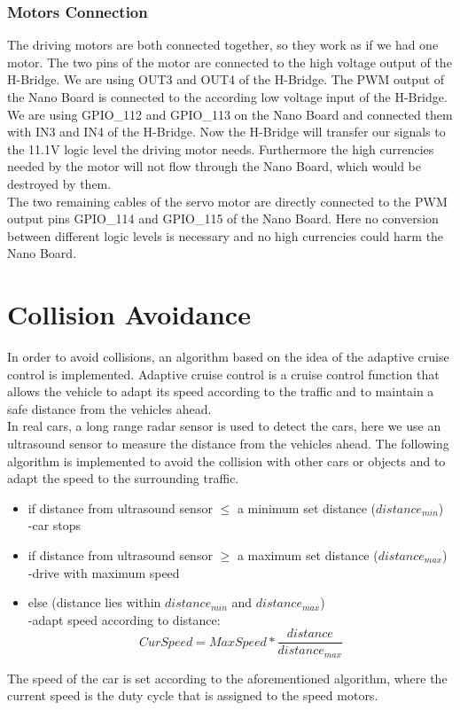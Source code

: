 \documentclass[11pt,twocolumn]{article}
\begin{document}
\subsubsection{Motors Connection}
The driving motors are both connected together, so they work as if we had one motor. The two pins of the motor are connected to the high voltage output of the H-Bridge. We are using OUT3 and OUT4 of the H-Bridge. The PWM output of the Nano Board is connected to the according low voltage input of the H-Bridge. We are using GPIO\_112 and GPIO\_113 on the Nano Board and connected them with IN3 and IN4 of the H-Bridge. Now the H-Bridge will transfer our signals to the 11.1V logic level the driving motor needs. Furthermore the high currencies needed by the motor will not flow through the Nano Board, which would be destroyed by them.\\
The two remaining cables of the servo motor are directly connected to the PWM output pins GPIO\_114 and GPIO\_115 of the Nano Board. Here no conversion between different logic levels is necessary and no high currencies could harm the Nano Board.



\section{Collision Avoidance}
\label{Usensor}
In order to avoid collisions, an algorithm based on the idea of the adaptive cruise control is implemented. Adaptive cruise control is a cruise control function that allows the vehicle to adapt its speed according to the traffic and to maintain a safe distance from the vehicles ahead.\\
In real cars, a long range radar sensor is used to detect the cars, here we use an ultrasound sensor to measure the distance from the vehicles ahead. The following algorithm is implemented to avoid the collision with other cars or objects and to adapt the speed to the surrounding traffic.
\begin{itemize}
	\item if distance from ultrasound sensor $\leq$ a minimum set distance ($distance_{min}$)\\
	-car stops
	\item if distance from ultrasound sensor $\geq$ a maximum set distance ($distance_{max}$)\\
	 -drive with maximum speed
	\item else (distance lies within $distance_{min}$ and $distance_{max}$)\\
	 -adapt speed according to distance:\\
	 \begin{equation}
	 CurSpeed = MaxSpeed * \frac{distance}{distance_{max}}
	 \end{equation}
\end{itemize}
The speed of the car is set according to the aforementioned algorithm, where the current speed is the duty cycle that is assigned to the speed motors.
\end{document}
